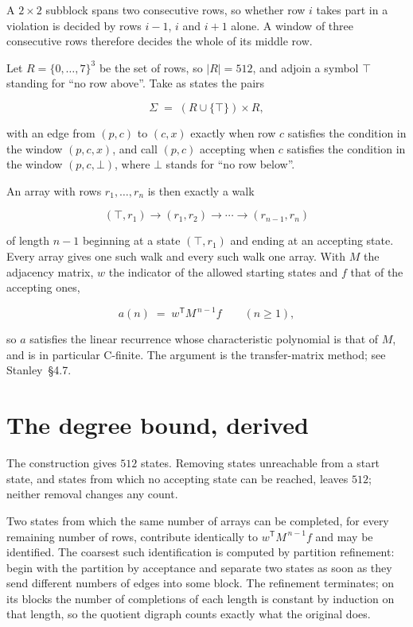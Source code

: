 \documentclass[11pt]{article}
\theoremstyle{definition}
\begin{document}
A $2 \times 2$ subblock spans two consecutive rows, so whether row $i$ takes part in a violation is decided by rows $i-1$, $i$ and $i+1$ alone. A window of three consecutive rows therefore decides the whole of its middle row.

Let $R = \{0,\dots,7\}^{3}$ be the set of rows, so $|R| = 512$, and adjoin a symbol $\top$ standing for ``no row above''. Take as states the pairs

\[\Sigma \;=\; (R \cup \{\top\}) \times R,\]

with an edge from $(p,c)$ to $(c,x)$ exactly when row $c$ satisfies the condition in the window $(p,c,x)$, and call $(p,c)$ accepting when $c$ satisfies the condition in the window $(p,c,\bot)$, where $\bot$ stands for ``no row below''.

An array with rows $r_1,\dots,r_n$ is then exactly a walk

\[(\top,r_1) \to (r_1,r_2) \to \cdots \to (r_{n-1},r_n)\]

of length $n-1$ beginning at a state $(\top,r_1)$ and ending at an accepting state. Every array gives one such walk and every such walk one array. With $M$ the adjacency matrix, $w$ the indicator of the allowed starting states and $f$ that of the accepting ones,

\[a(n) \;=\; w^{\mathsf T} M^{\,n-1} f \qquad (n \ge 1),\]

so $a$ satisfies the linear recurrence whose characteristic polynomial is that of $M$, and is in particular C-finite. The argument is the transfer-matrix method; see Stanley~\S4.7.

\section{The degree bound, derived}

The construction gives $512$ states. Removing states unreachable from a start state, and states from which no accepting state can be reached, leaves $512$; neither removal changes any count.

Two states from which the same number of arrays can be completed, for every remaining number of rows, contribute identically to $w^{\mathsf T}M^{\,n-1}f$ and may be identified. The coarsest such identification is computed by partition refinement: begin with the partition by acceptance and separate two states as soon as they send different numbers of edges into some block. The refinement terminates; on its blocks the number of completions of each length is constant by induction on that length, so the quotient digraph counts exactly what the original does.
\end{document}
